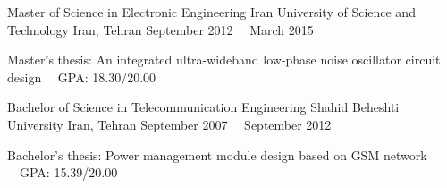 


\begin{cventries}
  \cventry
    {Master of Science in Electronic Engineering} %
    {Iran University of Science and Technology} %
    {Iran, Tehran} %
    {September 2012 ~\textemdash~March 2015} %
    {
      \begin{cvitems} %
        \item {Master's thesis: An integrated ultra-wideband low-phase noise oscillator circuit design ~\textendash~GPA: 18.30/20.00}
      \end{cvitems}
    }
  \cventry
    {Bachelor of Science in Telecommunication Engineering} %
    {Shahid Beheshti University } %
    {Iran, Tehran} %
    {September 2007 ~\textemdash~September 2012} %
    {
      \begin{cvitems} %
        \item {Bachelor's thesis: Power management module design based on GSM network ~\textendash~GPA: 15.39/20.00}
      \end{cvitems}
    }
\end{cventries}
